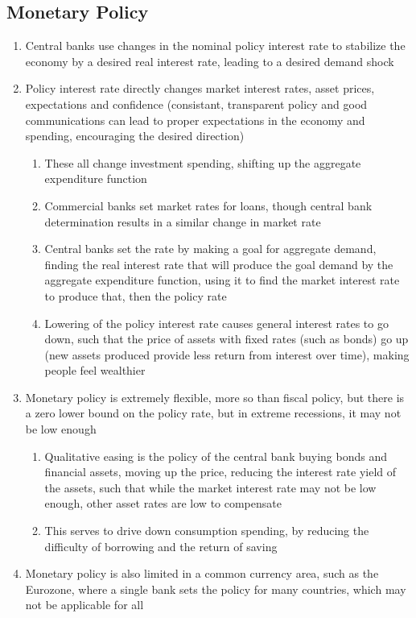 \documentclass[11 pt, twoside]{article}
\begin{document}
\subsection{Monetary Policy}
\begin{enumerate}
\item Central banks use changes in the nominal policy interest rate to stabilize the economy by a desired real interest rate, leading to a desired demand shock
\item Policy interest rate directly changes market interest rates, asset prices, expectations and confidence (consistant, transparent policy and good communications can lead to proper expectations in the economy and spending, encouraging the desired direction)
\begin{enumerate}
\item These all change investment spending, shifting up the aggregate expenditure function
\item Commercial banks set market rates for loans, though central bank determination results in a similar change in market rate
\item Central banks set the rate by making a goal for aggregate demand, finding the real interest rate that will produce the goal demand by the aggregate expenditure function, using it to find the market interest rate to produce that, then the policy rate
\item Lowering of the policy interest rate causes general interest rates to go down, such that the price of assets with fixed rates (such as bonds) go up (new assets produced provide less return from interest over time), making people feel wealthier
\end{enumerate}
\item Monetary policy is extremely flexible, more so than fiscal policy, but there is a zero lower bound on the policy rate, but in extreme recessions, it may not be low enough
\begin{enumerate}
\item Qualitative easing is the policy of the central bank buying bonds and financial assets, moving up the price, reducing the interest rate yield of the assets, such that while the market interest rate may not be low enough, other asset rates are low to compensate 
\item This serves to drive down consumption spending, by reducing the difficulty of borrowing and the return of saving
\end{enumerate}
\item Monetary policy is also limited in a common currency area, such as the Eurozone, where a single bank sets the policy for many countries, which may not be applicable for all

\end{enumerate}
\end{document}
